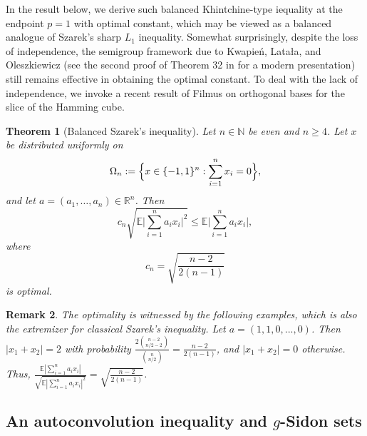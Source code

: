 \documentclass[11pt]{article}
\newtheorem{theorem}{Theorem}
\newtheorem{remark}[theorem]{Remark}
\begin{document}
In the result below, we derive such balanced Khintchine-type iequality at the endpoint \(p=1\) with optimal constant, which may be viewed as a balanced analogue of Szarek's sharp \(L_1\) inequality.  Somewhat surprisingly, despite the loss of independence, the semigroup framework due to Kwapie\'n, Lata\l a, and Oleszkiewicz \cite{KwapienLatalaOleszkiewicz96,LatalaOleszkiewicz94,LatalaOleszkiewicz94} (see the second proof of Theorem 32 in \cite{NT23} for a modern presentation) still remains effective in obtaining the optimal constant. To deal with the lack of independence, we invoke a recent result of Filmus \cite{Filmus16} on orthogonal bases for the slice of the Hamming cube.

\begin{theorem}[Balanced Szarek's inequality]\label{Szarek}
Let \(n\in\mathbb{N}\) be even and \(n\ge 4\). Let \(x\) be distributed uniformly on
\[
\Omega_n:=\Bigl\{x\in\{-1,1\}^n:\sum_{i=1}^n x_i=0\Bigr\},
\]
and let \(a=(a_1,\dots,a_n)\in\mathbb{R}^n\). Then
\[
c_n \sqrt{\mathbb{E}\Big|\sum_{i=1}^n a_i x_i\Big|^2}
\le
\mathbb{E}\Big|\sum_{i=1}^n a_i x_i\Big|,
\]
where
\[
c_n=\sqrt{\frac{n-2}{2(n-1)}}
\]
is optimal.
\end{theorem}

\begin{remark}
The optimality is witnessed by the following examples, which is also the extremizer for classical Szarek's inequality. Let $a=(1, 1, 0,...,0)$. Then $|x_1+x_2|=2$ with probability $\frac{2\binom{n-2}{n/2 -2}}{\binom{n}{n/2}}=\frac{n-2}{2(n-1)}$, and $|x_1+x_2|=0$ otherwise. Thus, $\frac{\mathbb{E}|\sum_{i=1}^n a_i x_i|}{\sqrt{\mathbb{E}|\sum_{i=1}^n a_i x_i|^2}} = \sqrt{\frac{n-2}{2(n-1)}}$.
\end{remark}

\subsection{An autoconvolution inequality and $g$-Sidon sets}
\end{document}

